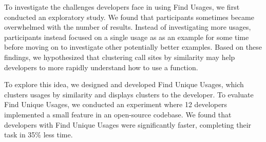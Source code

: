 \documentclass[conference]{IEEEtran}
\begin{document}



To investigate the challenges developers face in using Find Usages, we first conducted an exploratory study. We found that participants sometimes became overwhelmed with the number of results. Instead of investigating more usages, participants instead focused on a single usage as as an example for some time before moving on to investigate other potentially better examples.
Based on these findings, we hypothesized that clustering call sites by similarity may help developers to more rapidly understand how to use a function. \par

To explore this idea, we designed and developed Find Unique Usages, which clusters usages by similarity and displays clusters to the developer. 
To evaluate Find Unique Usages, we conducted  an  experiment where 12 developers implemented a small feature in an open-source codebase. We found that developers with Find Unique Usages were significantly faster, completing their task in 35\% less time.\par
\end{document}
